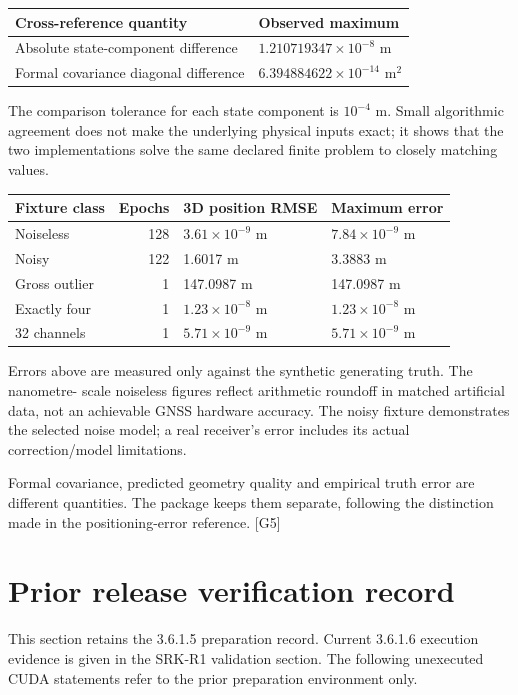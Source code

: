 \documentclass[11pt,a4paper]{article}
\newcommand{\ext}[1]{\textcolor{muted}{[#1]}}
\begin{document}
\begin{center}
\begin{tabularx}{\textwidth}{@{}P{.54\textwidth}Y@{}}\toprule
\textbf{Cross-reference quantity} & \textbf{Observed maximum}\\\midrule
Absolute state-component difference & $1.210719347\times10^{-8}$ m\\
Formal covariance diagonal difference & $6.394884622\times10^{-14}$ m$^2$\\\bottomrule
\end{tabularx}
\end{center}

The comparison tolerance for each state component is $10^{-4}$ m. Small algorithmic
agreement does not make the underlying physical inputs exact; it shows that the two
implementations solve the same declared finite problem to closely matching values.

\begin{center}
\begin{tabularx}{\textwidth}{@{}P{.31\textwidth}rYY@{}}\toprule
\textbf{Fixture class} & \textbf{Epochs} & \textbf{3D position RMSE} & \textbf{Maximum error}\\\midrule
Noiseless &128&$3.61\times10^{-9}$ m&$7.84\times10^{-9}$ m\\
Noisy &122&1.6017 m&3.3883 m\\
Gross outlier &1&147.0987 m&147.0987 m\\
Exactly four &1&$1.23\times10^{-8}$ m&$1.23\times10^{-8}$ m\\
32 channels &1&$5.71\times10^{-9}$ m&$5.71\times10^{-9}$ m\\\bottomrule
\end{tabularx}
\end{center}

Errors above are measured only against the synthetic generating truth. The nanometre-
scale noiseless figures reflect arithmetic roundoff in matched artificial data, not
an achievable GNSS hardware accuracy. The noisy fixture demonstrates the selected
noise model; a real receiver's error includes its actual correction/model limitations.

Formal covariance, predicted geometry quality and empirical truth error are different
quantities. The package keeps them separate, following the distinction made in the
positioning-error reference. \ext{G5}
\clearpage

\section{Prior release verification record}
This section retains the 3.6.1.5 preparation record. Current 3.6.1.6 execution
evidence is given in the SRK-R1 validation section. The following unexecuted
CUDA statements refer to the prior preparation environment only.
\end{document}
